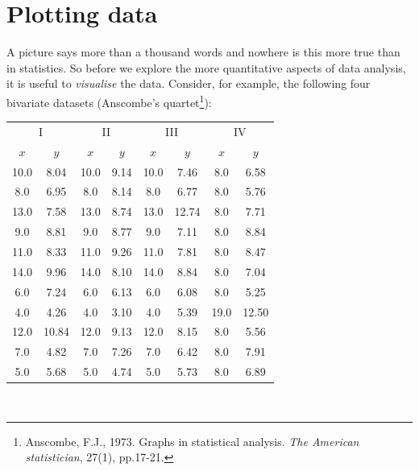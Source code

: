 \chapter{Plotting data}
\label{ch:plotting}

A picture says more than a thousand words and nowhere is this more
true than in statistics. So before we explore the more quantitative
aspects of data analysis, it is useful to \emph{visualise} the data.
Consider, for example, the following four bivariate datasets
(Anscombe's quartet\footnote{Anscombe, F.J., 1973. Graphs in
  statistical analysis. \emph{The American statistician}, 27(1),
  pp.17-21.}):\\

\noindent\begin{minipage}[t][][b]{.6\textwidth}
  \begin{tabular}{cc|cc|cc|cc}
    \multicolumn{2}{c}{I} & \multicolumn{2}{c}{II} &
    \multicolumn{2}{c}{III} & \multicolumn{2}{c}{IV} \\
    $x$ & $y$ & $x$ & $y$ & $x$ & $y$ & $x$ & $y$ \\ \hline
    10.0 & 8.04 & 10.0 & 9.14 & 10.0 & 7.46 & 8.0 & 6.58 \\
    8.0 & 6.95 & 8.0 & 8.14 & 8.0 & 6.77 & 8.0 & 5.76 \\
    13.0 & 7.58 & 13.0 & 8.74 & 13.0 & 12.74 & 8.0 & 7.71 \\
    9.0 & 8.81 & 9.0 & 8.77 & 9.0 & 7.11 & 8.0 & 8.84 \\
    11.0 & 8.33 & 11.0 & 9.26 & 11.0 & 7.81 & 8.0 & 8.47 \\
    14.0 & 9.96 & 14.0 & 8.10 & 14.0 & 8.84 & 8.0 & 7.04 \\
    6.0 & 7.24 & 6.0 & 6.13 & 6.0 & 6.08 & 8.0 & 5.25 \\
    4.0 & 4.26 & 4.0 & 3.10 & 4.0 & 5.39 & 19.0 & 12.50 \\
    12.0 & 10.84 & 12.0 & 9.13 & 12.0 & 8.15 & 8.0 & 5.56 \\
    7.0 & 4.82 & 7.0 & 7.26 & 7.0 & 6.42 & 8.0 & 7.91 \\
    5.0 & 5.68 & 5.0 & 4.74 & 5.0 & 5.73 & 8.0 & 6.89 \\
  \end{tabular}
\end{minipage}
\begin{minipage}[t][][t]{.4\textwidth}
  \label{tab:anscombe}
\end{minipage}\\


